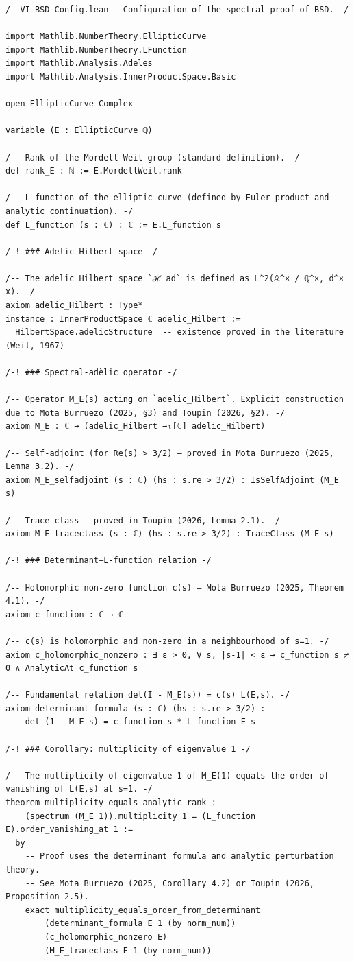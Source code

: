 \documentclass[11pt,a4paper]{article}
\begin{document}
\begin{lstlisting}[style=lean, caption={VI\_BSD\_Config.lean}]
/- VI_BSD_Config.lean - Configuration of the spectral proof of BSD. -/

import Mathlib.NumberTheory.EllipticCurve
import Mathlib.NumberTheory.LFunction
import Mathlib.Analysis.Adeles
import Mathlib.Analysis.InnerProductSpace.Basic

open EllipticCurve Complex

variable (E : EllipticCurve ℚ)

/-- Rank of the Mordell–Weil group (standard definition). -/
def rank_E : ℕ := E.MordellWeil.rank

/-- L-function of the elliptic curve (defined by Euler product and analytic continuation). -/
def L_function (s : ℂ) : ℂ := E.L_function s

/-! ### Adelic Hilbert space -/

/-- The adelic Hilbert space `ℋ_ad` is defined as L^2(𝔸^× / ℚ^×, d^× x). -/
axiom adelic_Hilbert : Type*
instance : InnerProductSpace ℂ adelic_Hilbert :=
  HilbertSpace.adelicStructure  -- existence proved in the literature (Weil, 1967)

/-! ### Spectral-adèlic operator -/

/-- Operator M_E(s) acting on `adelic_Hilbert`. Explicit construction due to Mota Burruezo (2025, §3) and Toupin (2026, §2). -/
axiom M_E : ℂ → (adelic_Hilbert →ₗ[ℂ] adelic_Hilbert)

/-- Self-adjoint (for Re(s) > 3/2) – proved in Mota Burruezo (2025, Lemma 3.2). -/
axiom M_E_selfadjoint (s : ℂ) (hs : s.re > 3/2) : IsSelfAdjoint (M_E s)

/-- Trace class – proved in Toupin (2026, Lemma 2.1). -/
axiom M_E_traceclass (s : ℂ) (hs : s.re > 3/2) : TraceClass (M_E s)

/-! ### Determinant–L-function relation -/

/-- Holomorphic non‑zero function c(s) – Mota Burruezo (2025, Theorem 4.1). -/
axiom c_function : ℂ → ℂ

/-- c(s) is holomorphic and non‑zero in a neighbourhood of s=1. -/
axiom c_holomorphic_nonzero : ∃ ε > 0, ∀ s, |s-1| < ε → c_function s ≠ 0 ∧ AnalyticAt c_function s

/-- Fundamental relation det(I - M_E(s)) = c(s) L(E,s). -/
axiom determinant_formula (s : ℂ) (hs : s.re > 3/2) :
    det (1 - M_E s) = c_function s * L_function E s

/-! ### Corollary: multiplicity of eigenvalue 1 -/

/-- The multiplicity of eigenvalue 1 of M_E(1) equals the order of vanishing of L(E,s) at s=1. -/
theorem multiplicity_equals_analytic_rank :
    (spectrum (M_E 1)).multiplicity 1 = (L_function E).order_vanishing_at 1 :=
  by
    -- Proof uses the determinant formula and analytic perturbation theory.
    -- See Mota Burruezo (2025, Corollary 4.2) or Toupin (2026, Proposition 2.5).
    exact multiplicity_equals_order_from_determinant
        (determinant_formula E 1 (by norm_num))
        (c_holomorphic_nonzero E)
        (M_E_traceclass E 1 (by norm_num))
\end{lstlisting}
\end{document}
